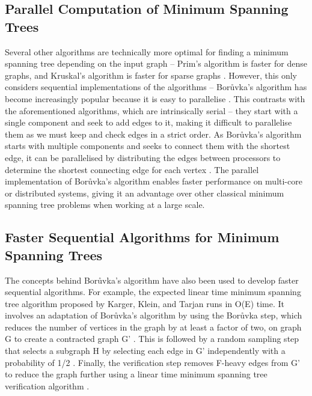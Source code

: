 \documentclass[a4paper, 11pt]{article}
\begin{document}
\newpage
\subsection{Parallel Computation of Minimum Spanning Trees}
Several other algorithms are technically more optimal for finding a minimum spanning tree depending on the input graph -- Prim's algorithm is faster for dense graphs, and Kruskal's algorithm is faster for sparse graphs \cite{bazlamaccci2001minimum}. However, this only considers sequential implementations of the algorithms -- Borůvka's algorithm has become increasingly popular because it is easy to parallelise \cite{mariano2015generic}. This contrasts with the aforementioned algorithms, which are intrinsically serial -- they start with a single component and seek to add edges to it, making it difficult to parallelise them as we must keep and check edges in a strict order. As Borůvka's algorithm starts with multiple components and seeks to connect them with the shortest edge, it can be parallelised by distributing the edges between processors to determine the shortest connecting edge for each vertex \cite{chung1996parallel}. The parallel implementation of Borůvka's algorithm enables faster performance on multi-core or distributed systems, giving it an advantage over other classical minimum spanning tree problems when working at a large scale.

\subsection{Faster Sequential Algorithms for Minimum Spanning Trees}
The concepts behind Borůvka's algorithm have also been used to develop faster sequential algorithms. For example, the expected linear time minimum spanning tree algorithm proposed by Karger, Klein, and Tarjan runs in O(E) time. It involves an adaptation of Borůvka's algorithm by using the Borůvka step, which reduces the number of vertices in the graph by at least a factor of two, on graph G to create a contracted graph G' \cite{dixon1992verification, king1995simpler}. This is followed by a random sampling step that selects a subgraph H by selecting each edge in G' independently with a probability of 1/2 \cite{bazlamaccci2001minimum}. Finally, the verification step removes F-heavy edges from G' to reduce the graph further using a linear time minimum spanning tree verification algorithm \cite{karger1995randomized, dixon1992verification, king1995simpler}.

\newpage


\end{document}
